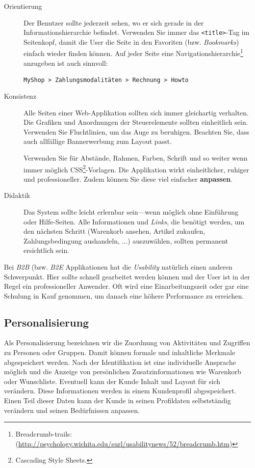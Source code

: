 \begin{description}
    \item[Orientierung] Der Benutzer sollte jederzeit sehen, wo er sich gerade
    in der Informationshierarchie befindet. Verwenden Sie immer das \texttt{<title>}-Tag
    im Seitenkopf, damit die User die Seite in den Favoriten (bzw. \emph{Bookmarks})
    einfach wieder finden können. Auf jeder Seite eine
    Navigationshierarchie\footnote{Breadcrumb-trails:
    (\href{http://psychology.wichita.edu/surl/usabilitynews/52/breadcrumb.htm}
    {http://psychology.wichita.edu/surl/usabilitynews/52/breadcrumb.htm})}
    anzugeben ist auch sinnvoll:

    \texttt{MyShop > Zahlungsmodalitäten > Rechnung > Howto}

    \item[Konsistenz] Alle Seiten einer Web-Applikation sollten sich immer
    gleichartig verhalten. Die Grafiken und Anordnungen der Steuerelemente
    sollten einheitlich sein. Verwenden Sie Fluchtlinien, um das Auge zu
    beruhigen. Beachten Sie, dass auch allfällige Bannerwerbung zum Layout passt.

    Verwenden Sie für Abstände, Rahmen, Farben, Schrift und so weiter wenn immer
    möglich CSS\footnote{Cascading Style Sheets.}-Vorlagen. Die Applikation wirkt
    einheitlicher, ruhiger und professioneller. Zudem können Sie diese viel
    einfacher \textbf{anpassen}.

    \item[Didaktik] Das System sollte leicht erlernbar sein---wenn möglich ohne
    Einführung oder Hilfe-Seiten. Alle Informationen und \emph{Links},
    die benötigt werden, um den nächsten Schritt (Warenkorb ansehen, Artikel
    zukaufen, Zahlungsbedingung aushandeln, $\ldots$) auszuwählen, sollten
    permanent ersichtlich sein.
\end{description}

Bei \emph{B2B} (bzw. \emph{B2E} Applikationen hat die \emph{Usability} natürlich
einen anderen Schwerpunkt. Hier sollte schnell gearbeitet werden können und der
User ist in der Regel ein professioneller Anwender. Oft wird eine
Einarbeitungszeit oder gar eine Schulung in Kauf genommen, um danach eine
höhere Performance zu erreichen.

\subsection{Personalisierung}

Als Personalisierung bezeichnen wir die Zuordnung von Aktivitäten und
Zugriffen zu Personen oder Gruppen. Damit können formale und inhaltliche
Merkmale abgespeichert werden. Nach der Identifikation ist eine individuelle
Ansprache möglich und die Anzeige von persönlichen Zusatzinformationen wie
Warenkorb oder Wunschliste. Eventuell kann der Kunde Inhalt und Layout
für sich verändern. Diese Informationen werden in einem Kundenprofil
abgespeichert. Einen Teil dieser Daten kann der Kunde in seinen
Profildaten selbstständig verändern und seinen Bedürfnissen anpassen.

